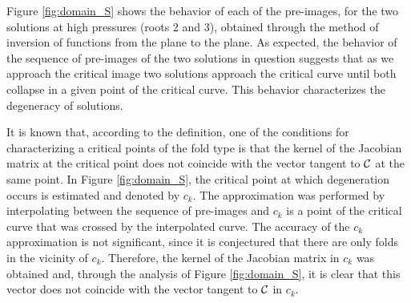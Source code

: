 \documentclass[journal=iecred,manuscript=article]{achemso}
\theoremstyle{definition}
\theoremstyle{remark}
\begin{document}
Figure \ref{fig:domain_S} shows the behavior of each of the pre-images, for the two solutions at high pressures (roots 2 and 3), obtained through the method of inversion of functions from the plane to the plane. As expected, the behavior of the sequence of pre-images of the two solutions in question suggests that as we approach the critical image two solutions approach the critical curve until both collapse in a given point of the critical curve. This behavior characterizes the degeneracy of solutions.

It is known that, according to the definition, one of the conditions for characterizing a critical points of the fold type is that the kernel of the Jacobian matrix at the critical point does not coincide with the vector tangent to $ {\cal{C}} $ at the same point. In Figure \ref{fig:domain_S}, the critical point at which degeneration occurs is estimated and denoted by $ c_{k} $. The approximation was performed by interpolating between the sequence of pre-images and $ c_{k} $ is a point of the critical curve that was crossed by the interpolated curve. The accuracy of the $ c_{k} $ approximation is not significant, since it is conjectured that there are only folds in the vicinity of $ c_{k} $. Therefore, the kernel of the Jacobian matrix in $ c_{k} $ was obtained and, through the analysis of Figure \ref{fig:domain_S}, it is clear that this vector does not coincide with the vector tangent to $ {\cal{C}} $ in $ c_{k} $.
\end{document}
